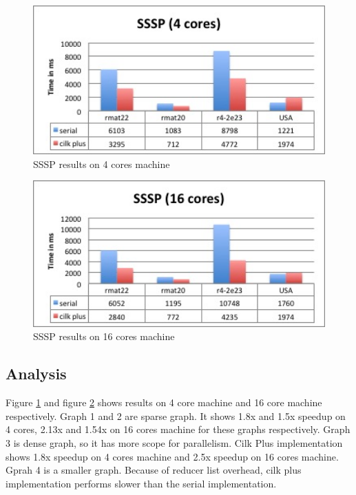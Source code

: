 \documentclass{article}
\begin{document}
\begin{figure}
   \centering
   \includegraphics[width=7.0in]{sssp4}
   \caption{SSSP results on 4 cores machine}
   \label{graph:sssp4}
\end{figure}

\begin{figure}
   \centering
   \includegraphics[width=7.0in]{sssp16}
   \caption{SSSP results on 16 cores machine}
   \label{graph:sssp16}
\end{figure}

\subsection{Analysis}

Figure \ref{graph:sssp4} and figure \ref{graph:sssp16} shows results on 4 core machine and 16 core machine respectively. Graph 1 and 2 are sparse graph. It shows 1.8x and 1.5x speedup on 4 cores, 2.13x and 1.54x on 16 cores machine for these graphs respectively. Graph 3 is dense graph, so it has more scope for parallelism. Cilk Plus implementation shows 1.8x speedup on 4 cores machine and 2.5x speedup on 16 cores machine. Gprah 4 is a smaller graph. Because of reducer list overhead, cilk plus implementation performs slower than the serial implementation. 
\end{document}
